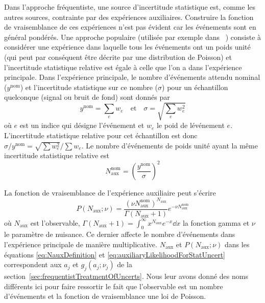 Dans l'approche fr\'equentiste, une source d'incertitude statistique est, comme les autres sources, contrainte par des exp\'eriences auxiliaires. Construire la fonction de vraisemblance de ces exp\'eriences n'est pas \'evident car les \'ev\'enements sont en g\'en\'eral pond\'er\'es. Une approche populaire (utilis\'ee par exemple dans \histfactory~\cite{Cranmer:1456844}) consiste \`a consid\'erer une exp\'erience dans laquelle tous les \'ev\'enements ont un poids unit\'e (qui peut par cons\'equent \^etre d\'ecrite par une distribution de Poisson) et l'incertitude statistique relative est \'egale \`a celle que l'on a dans l'exp\'erience principale. Dans l'exp\'erience principale, le nombre d'\'ev\'enements attendu nominal ($y^\text{nom}$) et l'incertitude statistique sur ce nombre ($\sigma$) pour un \'echantillon quelconque (signal ou bruit de fond) sont donn\'es par
\begin{equation}
\label{eq:yieldAndStatUncertFromWeights}
y^\text{nom}=\sum\limits_{e} w_e\quad\text{et}\quad\sigma=\sqrt{\sum\limits_{e} w_e^2}
\end{equation}
o\`u $e$ est un indice qui d\'esigne l'\'ev\'enement et $w_e$ le poid de l\'ev\'enement $e$. L'incertitude statistique relative pour cet \'echantillon est donc $\sigma/y^\text{nom}=\sqrt{\sum w_e^2}/\sum w_e$. Le nombre d'\'ev\'enements de poids unit\'e ayant la m\^eme incertitude statistique relative est
\begin{equation}
\label{eq:NauxDefinition}
N_\text{aux}^\text{nom}=\left(\frac{y^{\text{nom}}}{\sigma}\right)^2
\end{equation}

La fonction de vraisemblance de l'exp\'erience auxiliaire peut s'\'ecrire
\begin{equation}
\label{eq:auxiliaryLikelihoodForStatUncert}
P(N_\text{aux};\nu)=\frac{\left(\nu N_\text{aux}^\text{nom}\right)^{N_\text{aux}}}{\Gamma\left(N_\text{aux}+1\right)}e^{-\nu N_\text{aux}^\text{nom}}
\end{equation}
o\`u $N_\text{aux}$ est l'observable,  $\Gamma\left(N_\text{aux}+1\right)=\int_0^\infty x^{N_\text{aux}}e^{-x}\dd x$ la fonction gamma et $\nu$ le param\`etre de nuisance. Ce dernier affecte le nombre d'\'ev\'enements dans l'exp\'erience principale de mani\`ere multiplicative. $N_\text{aux}$ et $P(N_\text{aux};\nu)$ dans les \'equations \ref{eq:NauxDefinition} et \ref{eq:auxiliaryLikelihoodForStatUncert} correspondent aux $a_j$ et $g_j\left(a_j;\nu_j\right)$ de la section~\ref{sec:frequentistTreatmentOfUncerts}. Nous leur avons donn\'e des noms diff\'erents ici pour faire ressortir le fait que l'observable est un nombre d'\'ev\'enements et la fonction de vraisemblance une loi de Poisson.

